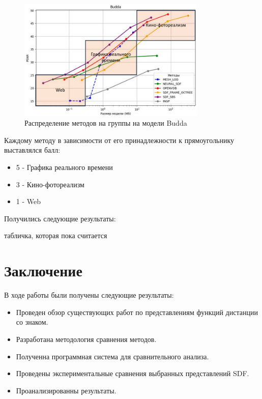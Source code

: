 \documentclass[a4paper,hidelinks,12pt]{article}
\begin{document}
\newpage

\begin{figure}[ht]
  \centering
  \includegraphics[width=0.8\textwidth]{budda1.png}
  \caption{Распределение методов на группы на модели Budda}
  \label{fig:example}
\end{figure}

\newpage

Каждому методу в зависимости от его принадлежности к прямоугольнику выставлялся балл:

\begin{itemize}
	\item 5 - Графика реального времени
	\item 3 - Кино-фотореализм
	\item 1 - Web
\end{itemize}

Получились следующие результаты:

табличка, которая пока считается

\newpage

\section{Заключение}

В ходе работы были получены следующие результаты:

\begin{itemize}
	\item Проведен обзор существующих работ по представлениям функций дистанции со знаком.
	\item Разработана методология сравнения методов.
	\item Полученна программная система для сравнительного анализа.
	\item Проведены экспериментальные сравнения выбранных представлений SDF.
	\item Проанализированны результаты.
\end{itemize}

\newpage



\end{document}
